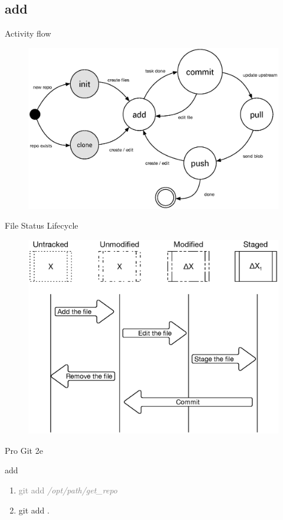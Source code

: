 \documentclass{beamer}
\begin{document}
\subsection[add]{add}
\begin{frame}{Activity flow}
    \begin{figure}
        \center
        \includegraphics[width=.9\textwidth]{git-command-flow-1}
        \label{fig:git-command-flow-1}
    \end{figure}
\end{frame}

\begin{frame}{File Status Lifecycle}
    \begin{figure}
        \center
        \includegraphics[width=.8\textwidth]{project-changed-0}
        \label{fig:project-changed}
    \end{figure}
    \small{Pro Git 2e}
\end{frame}

\begin{frame}{add}
    \begin{enumerate}[\$]
        \item<1-> \textcolor<2>{gray}{\Large{git add \em{/opt/path/get\_repo}}}
        \item<2> \Large{git add .}
    \end{enumerate}
\end{frame}
\end{document}
